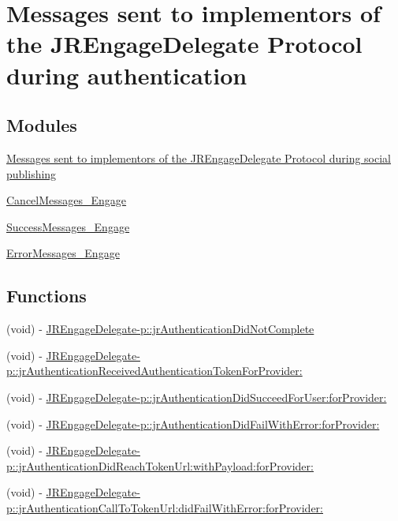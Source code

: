 \hypertarget{group___authentication_messages}{
\section{Messages sent to implementors of the JREngageDelegate Protocol during authentication}
\label{group___authentication_messages}
}
\subsection*{Modules}
\begin{DoxyCompactItemize}
\item 
\hyperlink{group___social_publishing_messages}{Messages sent to implementors of the JREngageDelegate Protocol during social publishing}
\item 
\hyperlink{group___cancel_messages___engage}{CancelMessages\_\-Engage}
\item 
\hyperlink{group___success_messages___engage}{SuccessMessages\_\-Engage}
\item 
\hyperlink{group___error_messages___engage}{ErrorMessages\_\-Engage}
\end{DoxyCompactItemize}
\subsection*{Functions}
\begin{DoxyCompactItemize}
\item 
(void) -\/ \hyperlink{group___authentication_messages_ga4eaa6a5961e175b8275c6b06034afea7}{JREngageDelegate-\/p::jrAuthenticationDidNotComplete}
\item 
(void) -\/ \hyperlink{group___authentication_messages_ga8f6dbef76c4f7223879ce82f5920b488}{JREngageDelegate-\/p::jrAuthenticationReceivedAuthenticationTokenForProvider:}
\item 
(void) -\/ \hyperlink{group___authentication_messages_ga4f7d0494498c551c858cdeb640b86eae}{JREngageDelegate-\/p::jrAuthenticationDidSucceedForUser:forProvider:}
\item 
(void) -\/ \hyperlink{group___authentication_messages_gac16b7db45fd324d597260dc8579b3a22}{JREngageDelegate-\/p::jrAuthenticationDidFailWithError:forProvider:}
\item 
(void) -\/ \hyperlink{group___authentication_messages_gabfafec7eed95008f7b7052d962f8f6fa}{JREngageDelegate-\/p::jrAuthenticationDidReachTokenUrl:withPayload:forProvider:}
\item 
(void) -\/ \hyperlink{group___authentication_messages_ga670eab0f76e79ba90a246a2f3e4dfe04}{JREngageDelegate-\/p::jrAuthenticationCallToTokenUrl:didFailWithError:forProvider:}
\end{DoxyCompactItemize}


